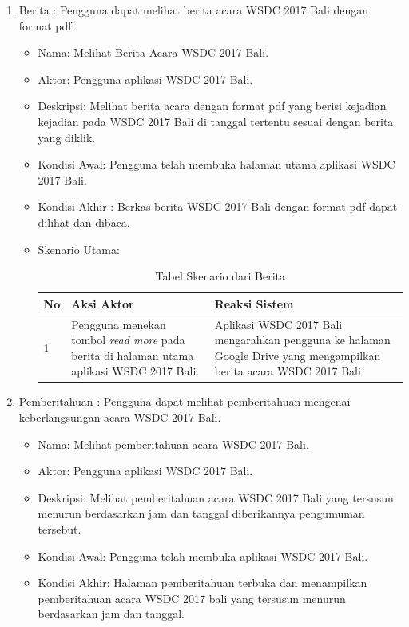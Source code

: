 \begin{enumerate}
\begin{itemize}
	\end{itemize}
	\item Berita : Pengguna dapat melihat berita acara WSDC 2017 Bali dengan format pdf.
	\begin{itemize}
		\item Nama: Melihat Berita Acara WSDC 2017 Bali.
		\item Aktor: Pengguna aplikasi WSDC 2017 Bali.
		\item Deskripsi: Melihat berita acara dengan format pdf yang berisi kejadian kejadian pada WSDC 2017 Bali di tanggal tertentu sesuai dengan berita yang diklik.
		\item Kondisi Awal: Pengguna telah membuka halaman utama aplikasi WSDC 2017 Bali.
		\item Kondisi Akhir : Berkas berita WSDC 2017 Bali dengan format pdf dapat dilihat dan dibaca.
		\item Skenario Utama: \\
		\begin{table}[H]
			\centering
			\begin{tabular}{|p{0.5cm}|p{7cm}|p{7cm}|}
				\hline
				No & Aksi Aktor                               & Reaksi Sistem                                          \\ \hline
				1  & Pengguna menekan tombol {\it read more} pada berita di halaman utama aplikasi WSDC 2017 Bali. & Aplikasi WSDC 2017 Bali mengarahkan pengguna ke halaman Google Drive yang mengampilkan berita acara WSDC 2017 Bali \\ \hline
			\end{tabular}
			\caption{Tabel Skenario dari Berita}
			\label{table:skenarioBerita}
		\end{table}
	\end{itemize}
	\item Pemberitahuan : Pengguna dapat melihat pemberitahuan mengenai keberlangsungan acara WSDC 2017 Bali.
	\begin{itemize}
		\item Nama: Melihat pemberitahuan acara WSDC 2017 Bali.
		\item Aktor: Pengguna aplikasi WSDC 2017 Bali.
		\item Deskripsi: Melihat pemberitahuan acara WSDC 2017 Bali yang tersusun menurun berdasarkan jam dan tanggal diberikannya pengumuman tersebut.
		\item Kondisi Awal: Pengguna telah membuka aplikasi WSDC 2017 Bali.
		\item Kondisi Akhir: Halaman pemberitahuan terbuka dan menampilkan pemberitahuan acara WSDC 2017 bali yang tersusun menurun berdasarkan jam dan tanggal.

\end{itemize}
\end{enumerate}
